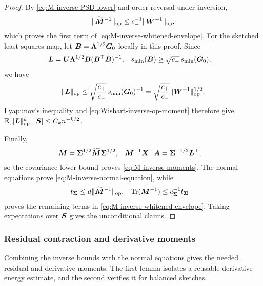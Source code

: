 \documentclass{article}
\theoremstyle{plain} %
\theoremstyle{definition} %
\theoremstyle{definition} %
\begin{document}
\begin{proof}
By \eqref{eq:M-inverse-PSD-lower} and order reversal under inversion,
\begin{align*}
    \lVert\widetilde{\boldsymbol{M}}^{-1}\rVert_{\rm op}
    \leq c_-^{-1}\lVert\boldsymbol{W}^{-1}\rVert_{\rm op},
\end{align*}
which proves the first term of
\eqref{eq:M-inverse-whitened-envelope}.  For the sketched least-squares map,
let $\boldsymbol{B}=\boldsymbol{\Lambda}^{1/2}\boldsymbol{G}_0$ locally in this proof. Since
\begin{align*}
    \boldsymbol{L}
    &=\boldsymbol{U}\boldsymbol{\Lambda}^{1/2}\boldsymbol{B}(\boldsymbol{B}^\top\boldsymbol{B})^{-1},
    &
    s_{\min}(\boldsymbol{B})&\geq\sqrt{c_-}\,s_{\min}(\boldsymbol{G}_0),
\end{align*}
we have
\begin{align*}
    \lVert\boldsymbol{L}\rVert_{\rm op}
    \leq\sqrt{\frac{c_+}{c_-}}\,
       s_{\min}(\boldsymbol{G}_0)^{-1}
    =\sqrt{\frac{c_+}{c_-}}
       \lVert\boldsymbol{W}^{-1}\rVert_{\rm op}^{1/2}.
\end{align*}
Lyapunov's inequality and \eqref{eq:Wishart-inverse-op-moment} therefore give
${\mathbb{E}}[\lVert\boldsymbol{L}\rVert_{\rm op}^k\mid\boldsymbol{S}]\leq C_kn^{-k/2}$.

Finally,
\begin{align*}
    \boldsymbol{M}
    &=\boldsymbol{\Sigma}^{1/2}\widetilde{\boldsymbol{M}}\boldsymbol{\Sigma}^{1/2},
    &
    \boldsymbol{M}^{-1}\boldsymbol{X}^\top\boldsymbol{A}
    &=\boldsymbol{\Sigma}^{-1/2}\boldsymbol{L}^\top,
\end{align*}
so the covariance lower bound proves \eqref{eq:M-inverse-moments}.
The normal equations prove \eqref{eq:M-inverse-normal-equation}, while
\begin{align*}
    t_{\boldsymbol{\Sigma}}
    &\leq d\lVert\widetilde{\boldsymbol{M}}^{-1}\rVert_{\rm op},
    &
    \operatorname{Tr}(\boldsymbol{M}^{-1})
    &\leq c_{\boldsymbol{\Sigma}}^{-1}
       t_{\boldsymbol{\Sigma}}
\end{align*}
proves the remaining terms in
\eqref{eq:M-inverse-whitened-envelope}.  Taking expectations over $\boldsymbol{S}$
gives the unconditional claims.
\end{proof}

\subsubsection{Residual contraction and derivative moments}

Combining the inverse bounds with the normal equations gives the needed
residual and derivative moments. The first lemma isolates a reusable
derivative-energy estimate, and the second verifies it for balanced sketches.
\end{document}
